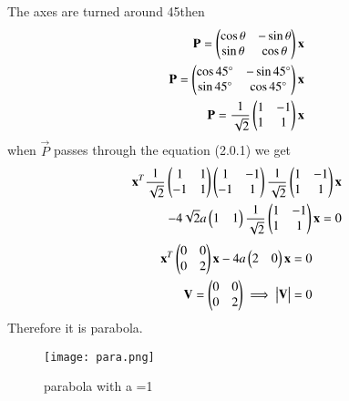 \documentclass[journal,12pt,twocolumn]{IEEEtran}
\begin{document}
The axes are turned around 45\degree then 
\begin{align}
    \mathbf{P}=\begin{pmatrix}\cos\theta & -\sin\theta \\ \sin\theta & \cos\theta\end{pmatrix}\mathbf{x}\\
    \mathbf{P}=\begin{pmatrix}\cos45\degree & -\sin45\degree \\ \sin45\degree & \cos45\degree\end{pmatrix}\mathbf{x}\\
    \mathbf{P} = \frac{1}{\sqrt{2}}\begin{pmatrix}1&-1\\1&1\end{pmatrix}\mathbf{x}
\end{align}
when $\vec{P}$ passes through the equation (2.0.1) we get
\begin{multline}
\begin{aligned}
\mathbf{x}^T\frac{1}{\sqrt{2}}\begin{pmatrix}1&1\\-1&1\end{pmatrix}\begin{pmatrix}1&-1\\-1&1\end{pmatrix}\frac{1}{\sqrt{2}}\begin{pmatrix}1&-1\\1&1\end{pmatrix}\mathbf{x}\\-4\sqrt{2}a\begin{pmatrix}1&1\end{pmatrix}\frac{1}{\sqrt{2}}\begin{pmatrix}1&-1\\1&1\end{pmatrix}\mathbf{x}=0
\end{aligned}
\end{multline}
\begin{align}
    \mathbf{x}^T\begin{pmatrix}0&0\\0&2\end{pmatrix}\mathbf{x}-4a\begin{pmatrix}2&0\end{pmatrix}\mathbf{x}=0\\
    \mathbf{V}=\begin{pmatrix}0&0\\0&2\end{pmatrix}\implies\begin{vmatrix}\mathbf{V}\end{vmatrix}=0
\end{align}
Therefore it is parabola.
\begin{figure}[!ht]
\centering
\texttt{[image: para.png]}
\caption{ parabola with a =1}
\label{Fig}
\end{figure}
\end{document}
